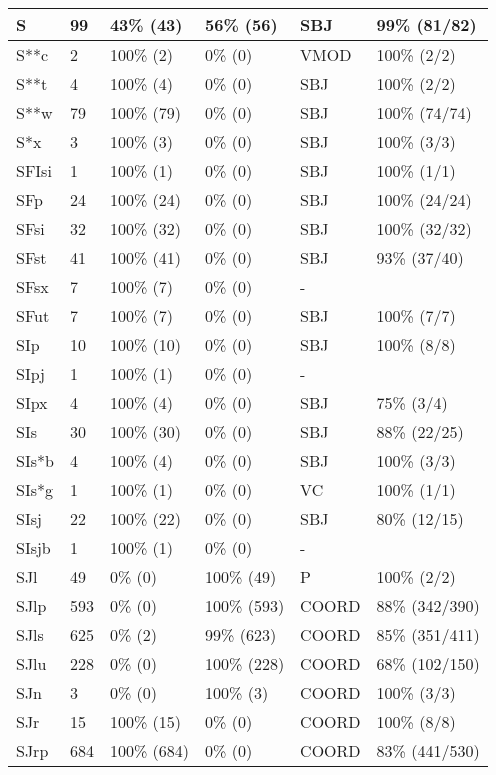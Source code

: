 \begin{figure*}
\begin{tabular}{|l|l|l|l||l|l|}
\hline
 S & 99 & 43\% (43) & 56\% (56) & SBJ & 99\% (81/82) \\ 
\hline
 S**c & 2 & 100\% (2) & 0\% (0) & VMOD & 100\% (2/2) \\ 
\hline
 S**t & 4 & 100\% (4) & 0\% (0) & SBJ & 100\% (2/2) \\ 
\hline
 S**w & 79 & 100\% (79) & 0\% (0) & SBJ & 100\% (74/74) \\ 
\hline
 S*x & 3 & 100\% (3) & 0\% (0) & SBJ & 100\% (3/3) \\ 
\hline
 SFIsi & 1 & 100\% (1) & 0\% (0) & SBJ & 100\% (1/1) \\ 
\hline
 SFp & 24 & 100\% (24) & 0\% (0) & SBJ & 100\% (24/24) \\ 
\hline
 SFsi & 32 & 100\% (32) & 0\% (0) & SBJ & 100\% (32/32) \\ 
\hline
 SFst & 41 & 100\% (41) & 0\% (0) & SBJ & 93\% (37/40) \\ 
\hline
 SFsx & 7 & 100\% (7) & 0\% (0) & - &  \\ 
\hline
 SFut & 7 & 100\% (7) & 0\% (0) & SBJ & 100\% (7/7) \\ 
\hline
 SIp & 10 & 100\% (10) & 0\% (0) & SBJ & 100\% (8/8) \\ 
\hline
 SIpj & 1 & 100\% (1) & 0\% (0) & - &  \\ 
\hline
 SIpx & 4 & 100\% (4) & 0\% (0) & SBJ & 75\% (3/4) \\ 
\hline
 SIs & 30 & 100\% (30) & 0\% (0) & SBJ & 88\% (22/25) \\ 
\hline
 SIs*b & 4 & 100\% (4) & 0\% (0) & SBJ & 100\% (3/3) \\ 
\hline
 SIs*g & 1 & 100\% (1) & 0\% (0) & VC & 100\% (1/1) \\ 
\hline
 SIsj & 22 & 100\% (22) & 0\% (0) & SBJ & 80\% (12/15) \\ 
\hline
 SIsjb & 1 & 100\% (1) & 0\% (0) & - &  \\ 
\hline
 SJl & 49 & 0\% (0) & 100\% (49) & P & 100\% (2/2) \\ 
\hline
 SJlp & 593 & 0\% (0) & 100\% (593) & COORD & 88\% (342/390) \\ 
\hline
 SJls & 625 & 0\% (2) & 99\% (623) & COORD & 85\% (351/411) \\ 
\hline
 SJlu & 228 & 0\% (0) & 100\% (228) & COORD & 68\% (102/150) \\ 
\hline
 SJn & 3 & 0\% (0) & 100\% (3) & COORD & 100\% (3/3) \\ 
\hline
 SJr & 15 & 100\% (15) & 0\% (0) & COORD & 100\% (8/8) \\ 
\hline
 SJrp & 684 & 100\% (684) & 0\% (0) & COORD & 83\% (441/530) \\ 
\hline
\end{tabular}
\end{figure*}
